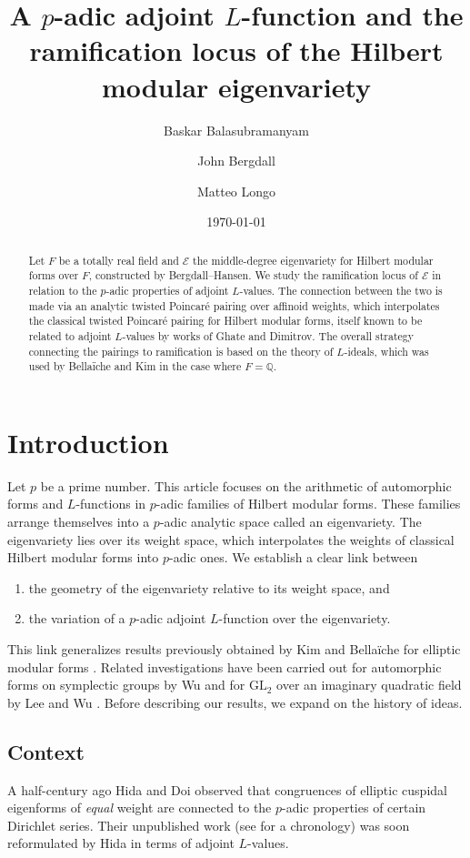 \documentclass[10pt, twoside]{amsart}
\title[A $p$-adic adjoint $L$-function and ramification of the Hilbert modular eigenvariety]{A $p$-adic adjoint $L$-function and the ramification locus of the Hilbert modular eigenvariety}
\date{\today}
\author{Baskar Balasubramanyam}
\author{John Bergdall}
\author{Matteo Longo}
\theoremstyle{plain}
\theoremstyle{definition}
\theoremstyle{remark}
\numberwithin{equation}{subsection}
\def\Q{\mathbb Q}
\def\GL{\mathrm{GL}}
\def\scre{\mathscr E}
\begin{document}
\begin{abstract}
Let $F$ be a totally real field and $\mathscr{E}$ the middle-degree eigenvariety for Hilbert modular forms over $F$, constructed by Bergdall--Hansen. 
We study the ramification locus of $\scre$ in relation to the $p$-adic properties of adjoint $L$-values. The connection between the two is made via an analytic twisted Poincar\'e pairing over affinoid weights, which interpolates the classical twisted Poincar\'e pairing for Hilbert modular forms, itself known to be related to adjoint $L$-values by works of Ghate and Dimitrov. The overall strategy connecting the pairings to ramification is based on the theory of $L$-ideals, which was used by Bella\"iche and Kim in the case where $F = \Q$.
\end{abstract}


\maketitle
\setcounter{tocdepth}{1}
\tableofcontents

\section{Introduction}

Let $p$ be a prime number. This article focuses on the arithmetic of automorphic forms and $L$-functions in $p$-adic families of Hilbert modular forms. These families arrange themselves into a $p$-adic analytic space called an eigenvariety. The eigenvariety lies over its weight space, which interpolates the weights of classical Hilbert modular forms into $p$-adic ones. We establish a clear link between 
\begin{enumerate}[label=(\roman*)]
\item the geometry of the eigenvariety relative to its weight space, and
\item the variation of a $p$-adic adjoint $L$-function over the eigenvariety. 
\end{enumerate}
This link generalizes results previously obtained by Kim and Bella\"iche for elliptic modular forms \cite{Kim,Bel}. Related investigations have been carried out for automorphic forms on symplectic groups by Wu and for $\GL_2$ over an imaginary quadratic field by Lee and Wu \cite{Wu,LeeWu-AdjointBianchi}. Before describing our results, we expand on the history of ideas.

\subsection{Context}
A half-century ago Hida and Doi observed that congruences of elliptic cuspidal eigenforms of {\em equal} weight are connected to the $p$-adic properties of certain Dirichlet series. Their unpublished work (see \cite{Hida-Pune} for a chronology) was soon reformulated by Hida in terms of adjoint $L$-values. 
\end{document}
